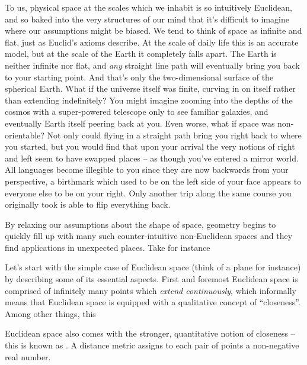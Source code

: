 To us, physical space at the scales which we inhabit is so intuitively Euclidean, and so baked into the very structures of our mind that it's difficult to imagine where our assumptions might be biased. We tend to think of space as infinite and flat, just as Euclid's axioms describe. At the scale of daily life this is an accurate model, but at the scale of the Earth it completely falls apart. The Earth is neither infinite nor flat, and \emph{any} straight line path will eventually bring you back to your starting point. 
And that's only the two-dimensional surface of the spherical Earth. What if the universe itself was finite, curving in on itself rather than extending indefinitely? You might imagine zooming into the depths of the cosmos with a super-powered telescope only to see familiar galaxies, and eventually Earth itself peering back at you.
Even worse, what if space was non-orientable? Not only could flying in a straight path bring you right back to where you started, but you would find that upon your arrival the very notions of right and left seem to have swapped places -- as though you've entered a mirror world. All languages become illegible to you since they are now backwards from your perspective, a birthmark which used to be on the left side of your face appears to everyone else to be on your right. Only another trip along the same course you originally took is able to flip everything back.

By relaxing our assumptions about the shape of space, geometry begins to quickly fill up with many such counter-intuitive non-Euclidean spaces and they find applications in unexpected places. Take for instance 

\hspace{1em}

Let's start with the simple case of Euclidean space (think of a plane for instance) by describing some of its essential aspects. First and foremost Euclidean space is comprised of infinitely many points which \emph{extend continuously}, which informally means that Euclidean space is equipped with a qualitative concept of ``closeness''. Among other things, this 

Euclidean space also comes with the stronger, quantitative notion of closeness -- this is known as . A distance metric assigns to each pair of points a non-negative real number.


%
%
%
%
%
%

